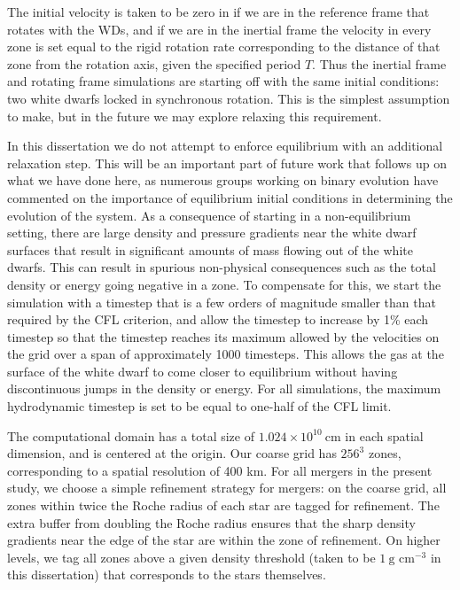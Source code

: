 \documentclass[12pt]{article}
\begin{document}
The initial velocity is taken to be zero in if we are in the reference
frame that rotates with the WDs, and if we are in the inertial frame
the velocity in every zone is set equal to the rigid rotation rate 
corresponding to the distance of that zone from the rotation axis, given
the specified period $T$. Thus the inertial frame and rotating frame 
simulations are starting off with the same initial conditions: two white 
dwarfs locked in synchronous rotation. This is the simplest assumption to 
make, but in the future we may explore relaxing this requirement.

In this dissertation we do not attempt to enforce equilibrium with an additional relaxation
step. This will be an important part of future work that follows up on
what we have done here, as numerous groups working on binary evolution
\citep{swc:2000,motl:2002,rosswog:2004,dan:2011,pakmor:2012:gadget}
have commented on the importance of equilibrium initial conditions in
determining the evolution of the system. As a consequence of starting 
in a non-equilibrium setting, there are 
large density and pressure gradients near the white dwarf surfaces
that result in significant amounts of mass flowing out of the white dwarfs.
This can result in spurious non-physical consequences such as 
the total density or energy going negative in a zone. To compensate 
for this, we start the simulation with a timestep that is a few orders 
of magnitude smaller than that required by the CFL criterion, and allow
the timestep to increase by 1\% each timestep so that the timestep reaches 
its maximum allowed by the velocities on the grid over a span of approximately 
1000 timesteps. This allows the gas at the surface of the white dwarf
to come closer to equilibrium without having discontinuous jumps in the
density or energy. For all simulations, the maximum hydrodynamic timestep
is set to be equal to one-half of the CFL limit.

The computational domain has a total size of $1.024 \times
10^{10}\ \text{cm}$ in each spatial dimension, and is centered at the
origin. Our coarse grid has $256^3$ zones, corresponding to a spatial
resolution of 400 km. For all mergers in the present study, we choose a simple
refinement strategy for mergers: on the coarse grid, all zones within
twice the Roche radius of each star are tagged for refinement. The extra
buffer from doubling the Roche radius ensures that the sharp density gradients near
the edge of the star are within the zone of refinement. On higher levels, 
we tag all zones above a given density threshold (taken to be $1\ \text{g cm}^{-3}$ 
in this dissertation) that corresponds to the stars themselves.
\end{document}
